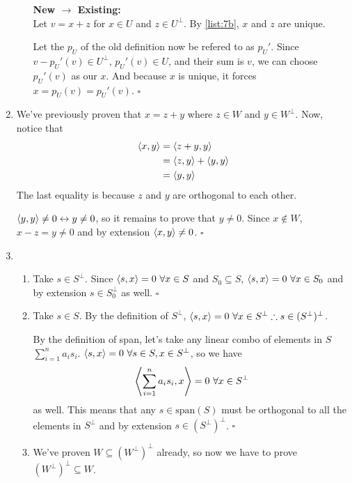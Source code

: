 \documentclass[12pt]{article}
\begin{document}
\begin{enumerate}
\begin{enumerate}
                        \textbf{New $\rightarrow$ Existing:} \\
                        Let $v=x+z$ for $x \in U$ and $z \in U^\perp$.
                        By \ref{list:7b}, $x$ and $z$ are unique.

                        Let the $p_U$ of the old definition now be refered to as $p_U'$.
                        Since $v-p_U'(v) \in U^\perp$, $p_U'(v) \in U$, and their sum is $v$,
                        we can choose $p_U'(v)$ as our $x$.
                        And because $x$ is unique, it forces $x=p_U(v)=p_U'(v)$. $\square$
            \end{enumerate}
      \item We've previously proven that $x=z+y$ where $z \in W$ and $y \in W^\perp$.
            Now, notice that
            \begin{align*}
                  \braket{x, y} & = \braket{z+y, y}               \\
                                & = \braket{z, y} + \braket{y, y} \\
                                & = \braket{y, y}
            \end{align*}
            The last equality is because $z$ and $y$ are orthogonal to each other.

            $\braket{y, y} \ne 0 \leftrightarrow y \ne 0$, so it remains to prove
            that $y \ne 0$.
            Since $x \notin W$, $x-z=y \ne 0$ and by extension $\braket{x, y} \ne 0$.
            $\square$ \label{list:8}
      \item \begin{enumerate}
                  \item Take $s \in S^\perp$.
                        Since $\braket{s, x}=0\ \forall x \in S$ and $S_0 \subseteq S$,
                        $\braket{s, x}=0\ \forall x \in S_0$ and
                        by extension $s \in S_0^\perp$ as well. $\square$
                  \item Take $s \in S$.
                        By the definition of $S^\perp$, $\braket{s, x}=0\ \forall x \in S^\perp \therefore s \in (S^\perp)^\perp$.

                        By the definition of span, let's take any linear combo
                        of elements in $S$ $\sum_{i=1}^{n} a_i s_i$.
                        $\braket{s, x}=0\ \forall s \in S, x \in S^\perp$,
                        so we have
                        \[\Braket{\sum_{i=1}^{n} a_i s_i, x}=0\ \forall x \in S^\perp\]
                        as well.
                        This means that any $s \in \text{span}(S)$ must be orthogonal
                        to all the elements in $S^\perp$ and by extension $s \in (S^\perp)^\perp$. $\square$
                  \item We've proven $W \subseteq (W^\perp)^\perp$ already,
                        so now we have to prove $(W^\perp)^\perp \subseteq W$.


\end{enumerate}
\end{enumerate}
\end{document}
